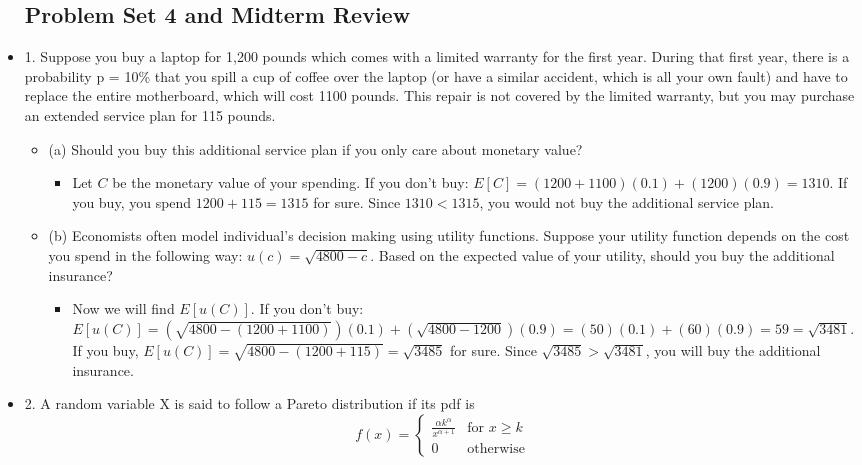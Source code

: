 \documentclass{article}
\begin{document}
\begin{itemize}
\subsection{Problem Set 4 and Midterm Review}
    \item 1. Suppose you buy a laptop for 1,200 pounds which comes with a limited warranty for the first year. During that first year, there is a probability p = 10\% that you spill a cup of coffee over the laptop (or have a similar accident, which is all your own fault) and have to replace the entire motherboard, which will cost 1100 pounds. This repair is not covered by the limited warranty, but you may purchase an extended service plan for 115 pounds.
    \begin{itemize}
        \item (a) Should you buy this additional service plan if you only care about monetary value?
        \begin{itemize}
            \item Let $C$ be the monetary value of your spending. If you don't buy: $E[C] = (1200+1100)(0.1) + (1200)(0.9) = 1310$. If you buy, you spend $1200+115=1315$ for sure. Since $1310 < 1315$, you would not buy the additional service plan.
        \end{itemize}
        \item (b) Economists often model individual’s decision making using utility functions. Suppose your utility function depends on the cost you spend in the following way: $u(c) = \sqrt{4800 - c}$. Based on the expected value of your utility, should you buy the additional insurance?
        \begin{itemize}
            \item Now we will find $E[u(C)]$. If you don't buy: $E[u(C)] = (\sqrt{4800-(1200+1100)})(0.1) + (\sqrt{4800-1200})(0.9) = (50)(0.1) + (60)(0.9) = 59 = \sqrt{3481}$. If you buy, $E[u(C)] = \sqrt{4800-(1200+115)} = \sqrt{3485}$ for sure. Since $\sqrt{3485} > \sqrt{3481}$, you will buy the additional insurance.
        \end{itemize}
    \end{itemize}
    \item 2. A random variable X is said to follow a Pareto distribution if its pdf is
    \[
    f(x) = \left\{ \begin{array}{cl}
        \frac{\alpha k^\alpha}{x^{\alpha+1}} & \text{for } x \ge k \\
        0 & \text{otherwise} 
    \end{array} \right.
\]
\end{itemize}
\end{document}
